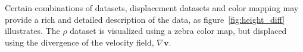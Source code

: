 Certain combinations of datasets, displacement datasets and color mapping may provide a rich and detailed description of the data, as figure~\ref{fig:height_diff} illustrates.
The \(\rho\) dataset is visualized using a zebra color map, but displaced using the divergence of the velocity field, \(\nabla \mathbf{v}\).




\clearpage